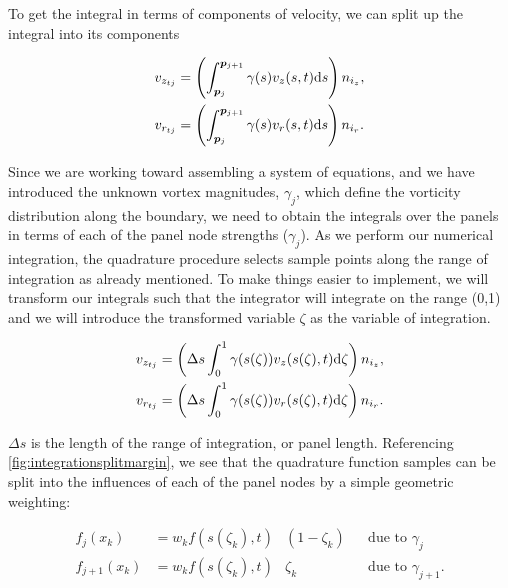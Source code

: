 %
To get the integral in terms of components of velocity, we can split up the integral into its components

\begin{subequations}
    \begin{align}
        v_{z_{tj}} &=\left(\int_{\bm{p}_j}^{\bm{p}_{j+1}} \gamma(s) v_z(s,t) \mathrm{d} s \right)n_{i_z},\\
        v_{r_{tj}} &=\left(\int_{\bm{p}_j}^{\bm{p}_{j+1}} \gamma(s) v_r(s,t) \mathrm{d} s\right)n_{i_r}.
    \end{align}
\end{subequations}

Since we are working toward assembling a system of equations, and we have introduced the unknown vortex magnitudes, \(\gamma_j\), which define the vorticity distribution along the boundary, we need to obtain the integrals over the panels in terms of each of the panel node strengths (\(\gamma_j\)).
%
As we perform our numerical integration, the quadrature procedure selects sample points along the range of integration as already mentioned.
%
To make things easier to implement, we will transform our integrals such that the integrator will integrate on the range (0,1) and we will introduce the transformed variable \(\zeta\) as the variable of integration.

\begin{subequations}
    \begin{align}
        v_{z_{tj}} &=\left(\Delta s \int_{0}^{1}\gamma(s(\zeta)) v_z(s(\zeta),t) \mathrm{d} \zeta \right)n_{i_z},\\
        v_{r_{tj}} &=\left(\Delta s \int_{0}^{1}\gamma(s(\zeta)) v_r(s(\zeta),t) \mathrm{d} \zeta \right)n_{i_r}.
    \end{align}
\end{subequations}

\where \(\Delta s\) is the length of the range of integration, or panel length.
%
Referencing \cref{fig:integrationsplitmargin}, we see that the quadrature function samples can be split into the influences of each of the panel nodes by a simple geometric weighting:

\begin{subequations}
    \label{eqn:integrationpieces}
    \begin{align}
        f_j(x_k) &= w_k f(s(\zeta_k),t)&(1-\zeta_k) && \text{due to } \gamma_j \\
        f_{j+1}(x_k) &= w_k f(s(\zeta_k),t)&\zeta_k && \text{due to } \gamma_{j+1}.
    \end{align}
\end{subequations}

